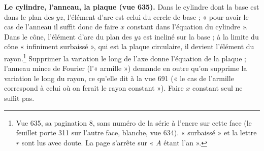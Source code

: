 \documentclass[11pt,a4paper]{article}
\begin{document}
\textbf{Le cylindre, l'anneau, la plaque (vue 635).} Dans le cylindre dont la
base est dans le plan des $yz$, l'élément d'arc est celui du cercle de base ;
« pour avoir le cas de l'anneau il suffit donc de faire $x$ constant dans
l'équation du cylindre ». Dans le cône, l'élément d'arc du plan des $yz$ est
incliné sur la base ; à la limite du cône « infiniment surbaissé », qui est la
plaque circulaire, il devient l'élément du rayon.\footnote{Vue 635, sa
pagination 8, sans numéro de la série à l'encre sur cette face (le feuillet
porte 311 sur l'autre face, blanche, vue 634). « surbaissé » et la lettre $r$
sont lus avec doute. La page s'arrête sur « $A$ étant l'an ».} Supprimer la
variation le long de l'axe donne l'équation de la plaque ; l'anneau mince de
Fourier (l'« armille ») demande en outre qu'on supprime la variation le long du
rayon, ce qu'elle dit à la vue 691 (« le cas de l'armille correspond à celui
où on ferait le rayon constant »). Faire $x$ constant seul ne suffit pas.
\end{document}
